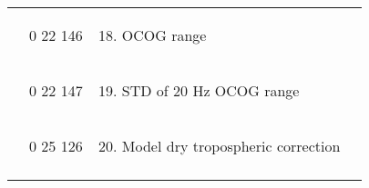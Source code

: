 \begin{longtable}[]{@{}llll@{}}
\begin{minipage}[t]{0.22\columnwidth}
\strut
\end{minipage} & \begin{minipage}[t]{0.22\columnwidth}\raggedright
0 22 146\strut
\end{minipage} & \begin{minipage}[t]{0.22\columnwidth}\raggedright
\begin{enumerate}
\setcounter{enumi}{17}
\item
  OCOG range
\end{enumerate}\strut
\end{minipage} & \begin{minipage}[t]{0.22\columnwidth}\raggedright
\strut
\end{minipage}\tabularnewline
\begin{minipage}[t]{0.22\columnwidth}\raggedright
\strut
\end{minipage} & \begin{minipage}[t]{0.22\columnwidth}\raggedright
0 22 147\strut
\end{minipage} & \begin{minipage}[t]{0.22\columnwidth}\raggedright
\begin{enumerate}
\setcounter{enumi}{18}
\item
  STD of 20 Hz OCOG range
\end{enumerate}\strut
\end{minipage} & \begin{minipage}[t]{0.22\columnwidth}\raggedright
\strut
\end{minipage}\tabularnewline
\begin{minipage}[t]{0.22\columnwidth}\raggedright
\strut
\end{minipage} & \begin{minipage}[t]{0.22\columnwidth}\raggedright
0 25 126\strut
\end{minipage} & \begin{minipage}[t]{0.22\columnwidth}\raggedright
\begin{enumerate}
\setcounter{enumi}{19}
\item
  Model dry tropospheric correction
\end{enumerate}\strut
\end{minipage} & \begin{minipage}[t]{0.22\columnwidth}\raggedright
\strut
\end{minipage}\tabularnewline
\begin{minipage}[t]{0.22\columnwidth}\raggedright
\strut
\end{minipage} & \begin{minipage}[t]{0.22\columnwidth}\raggedright

\end{minipage}
\end{longtable}
